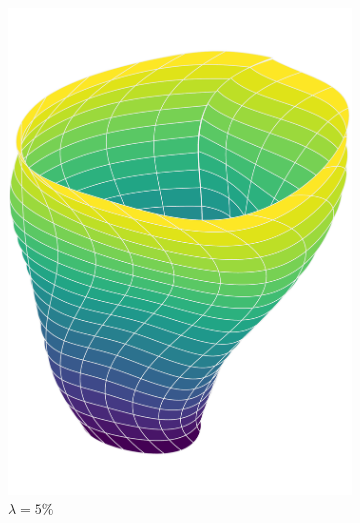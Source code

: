 \documentclass[article]{memoir}
\begin{document}
\begin{figure}[htbp]
    \centering
    \begin{subfigure}{0.32\textwidth}
        \includegraphics[width=\linewidth]{../images/surfaces_lambda_5_cropped.pdf}
        \caption{\( \lambda = 5 \% \)}
    \end{subfigure}
    \begin{subfigure}{0.32\textwidth}

\end{subfigure}
\end{figure}
\end{document}
